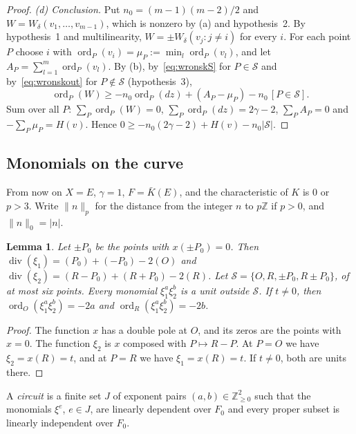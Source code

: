 \documentclass[11pt]{article}
\newtheorem{lemma}[theorem]{Lemma}
\theoremstyle{definition}\newtheorem{definition}[theorem]{Definition}
\theoremstyle{remark}\newtheorem{remark}[theorem]{Remark}
\begin{document}
\begin{proof}
\emph{(d) Conclusion.} Put $n_0=(m-1)(m-2)/2$ and
$W=W_\delta(v_1,\ldots,v_{m-1})$, which is nonzero by (a) and
hypothesis~2. By hypothesis~1 and multilinearity,
$W=\pm W_\delta(v_j:j\ne i)$ for every $i$. For each point $P$ choose $i$
with $\operatorname{ord}_P(v_i)=\mu_P:=\min_l\operatorname{ord}_P(v_l)$,
and let $A_P=\sum_{l=1}^m\operatorname{ord}_P(v_l)$. By (b),
by~\eqref{eq:wronskS} for $P\in\mathcal S$ and by~\eqref{eq:wronskout}
for $P\notin\mathcal S$ (hypothesis~3),
\[
 \operatorname{ord}_P(W)\ge-n_0\operatorname{ord}_P(dz)+(A_P-\mu_P)
 -n_0\,[P\in\mathcal S].
\]
Sum over all $P$: $\sum_P\operatorname{ord}_P(W)=0$,
$\sum_P\operatorname{ord}_P(dz)=2\gamma-2$, $\sum_PA_P=0$ and
$-\sum_P\mu_P=H(v)$. Hence
$0\ge-n_0(2\gamma-2)+H(v)-n_0|\mathcal S|$.
\end{proof}

\subsection{Monomials on the curve}\label{app:growthcurve}
From now on $X=E$, $\gamma=1$, $F=\bar K(E)$, and the characteristic of
$K$ is $0$ or $p>3$. Write $\|n\|_p$ for the distance from the integer $n$
to $p\mathbb Z$ if $p>0$, and $\|n\|_0=|n|$.

\begin{lemma}\label{lem:divisors}
Let $\pm P_0$ be the points with $x(\pm P_0)=0$. Then
$\operatorname{div}(\xi_1)=(P_0)+(-P_0)-2(O)$ and
$\operatorname{div}(\xi_2)=(R-P_0)+(R+P_0)-2(R)$. Let
$\mathcal S=\{O,R,\pm P_0,R\pm P_0\}$, of at most six points. Every
monomial $\xi_1^a\xi_2^b$ is a unit outside $\mathcal S$. If $t\ne0$, then
$\operatorname{ord}_O(\xi_1^a\xi_2^b)=-2a$ and
$\operatorname{ord}_R(\xi_1^a\xi_2^b)=-2b$.
\end{lemma}
\begin{proof}
The function $x$ has a double pole at $O$, and its zeros are the points
with $x=0$. The function $\xi_2$ is $x$ composed with $P\mapsto R-P$. At
$P=O$ we have $\xi_2=x(R)=t$, and at $P=R$ we have $\xi_1=x(R)=t$. If
$t\ne0$, both are units there.
\end{proof}

A \emph{circuit} is a finite set $J$ of exponent pairs
$(a,b)\in\mathbb Z_{\ge0}^2$ such that the monomials $\xi^e$, $e\in J$,
are linearly dependent over $F_0$ and every proper subset is linearly
independent over $F_0$.
\end{document}
